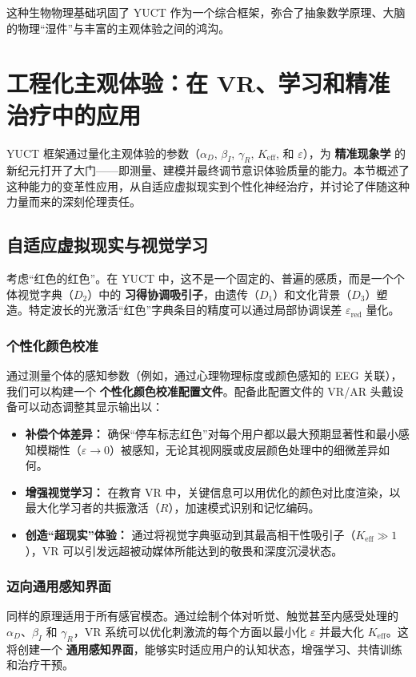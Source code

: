 \documentclass[12pt,a4paper]{article}
\begin{document}
	这种生物物理基础巩固了 YUCT 作为一个综合框架，弥合了抽象数学原理、大脑的物理“湿件”与丰富的主观体验之间的鸿沟。
	
	\section{工程化主观体验：在 VR、学习和精准治疗中的应用}
	
	YUCT 框架通过量化主观体验的参数（\(\alpha_D\), \(\beta_I\), \(\gamma_R\), \(K_{\mathrm{eff}}\), 和 \(\varepsilon\)），为 \textbf{精准现象学} 的新纪元打开了大门——即测量、建模并最终调节意识体验质量的能力。本节概述了这种能力的变革性应用，从自适应虚拟现实到个性化神经治疗，并讨论了伴随这种力量而来的深刻伦理责任。
	
	\subsection{自适应虚拟现实与视觉学习}
	
	考虑“红色的红色”。在 YUCT 中，这不是一个固定的、普遍的感质，而是一个个体视觉字典（\(D_2\)）中的 \textbf{习得协调吸引子}，由遗传（\(D_1\)）和文化背景（\(D_3\)）塑造。特定波长的光激活“红色”字典条目的精度可以通过局部协调误差 \(\varepsilon_{\text{red}}\) 量化。
	
	\subsubsection{个性化颜色校准}
	通过测量个体的感知参数（例如，通过心理物理标度或颜色感知的 EEG 关联），我们可以构建一个 \textbf{个性化颜色校准配置文件}。配备此配置文件的 VR/AR 头戴设备可以动态调整其显示输出以：
	\begin{itemize}
		\item \textbf{补偿个体差异：} 确保“停车标志红色”对每个用户都以最大预期显著性和最小感知模糊性（\(\varepsilon \to 0\)）被感知，无论其视网膜或皮层颜色处理中的细微差异如何。
		\item \textbf{增强视觉学习：} 在教育 VR 中，关键信息可以用优化的颜色对比度渲染，以最大化学习者的共振激活（\(R\)），加速模式识别和记忆编码。
		\item \textbf{创造“超现实”体验：} 通过将视觉字典驱动到其最高相干性吸引子（\(K_{\mathrm{eff}} \gg 1\)），VR 可以引发远超被动媒体所能达到的敬畏和深度沉浸状态。
	\end{itemize}
	
	\subsubsection{迈向通用感知界面}
	同样的原理适用于所有感官模态。通过绘制个体对听觉、触觉甚至内感受处理的 \(\alpha_D\)、\(\beta_I\) 和 \(\gamma_R\)，VR 系统可以优化刺激流的每个方面以最小化 \(\varepsilon\) 并最大化 \(K_{\mathrm{eff}}\)。这将创建一个 \textbf{通用感知界面}，能够实时适应用户的认知状态，增强学习、共情训练和治疗干预。
	
\end{document}
